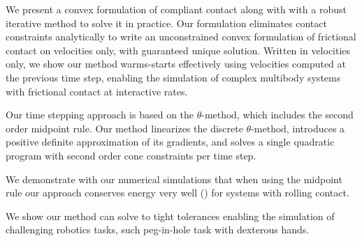 We present a convex formulation of compliant contact along with with a robust
iterative method to solve it in practice. Our formulation eliminates contact
constraints analytically to write an unconstrained convex formulation of
frictional contact on velocities only, with guaranteed unique solution. Written in velocities only, we show our method warms-starts effectively using velocities computed at the previous time step, enabling the simulation of complex multibody systems with frictional contact at interactive rates. 

Our time stepping approach is based on the $\theta\text{-method}$, which includes the second order midpoint rule. Our method linearizes the discrete $\theta\text{-method}$, introduces a positive definite approximation of its gradients, and solves a single quadratic program with second order cone constraints per time step.

We demonstrate with our numerical simulations that when using the midpoint rule
our approach conserves energy very well () for
systems with rolling contact.

We show our method can solve to tight tolerances enabling the simulation of challenging robotics tasks, such peg-in-hole task with dexterous hands.


